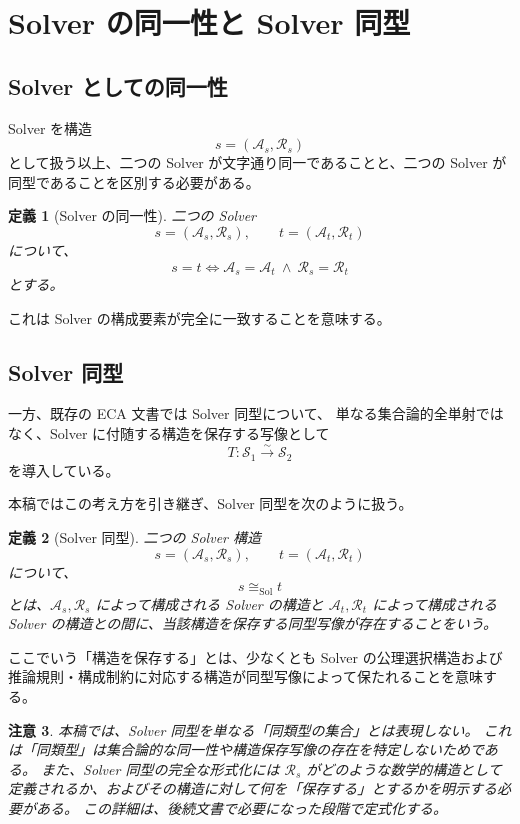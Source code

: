 \documentclass[a4paper,11pt]{jsarticle}
\newtheorem{definition}{定義}[section]
\newtheorem{remark}[definition]{注意}
\newcommand{\Solver}{\mathcal{S}}
\begin{document}
\section{Solver の同一性と Solver 同型}

\subsection{Solver としての同一性}

Solver を構造
\[
s=(\mathcal{A}_s,\mathcal{R}_s)
\]
として扱う以上、二つの Solver が文字通り同一であることと、二つの Solver が同型であることを区別する必要がある。

\begin{definition}[Solver の同一性]
二つの Solver
\[
s=(\mathcal{A}_s,\mathcal{R}_s),
\qquad
t=(\mathcal{A}_t,\mathcal{R}_t)
\]
について、
\[
\boxed{
s=t
\iff
\mathcal{A}_s=\mathcal{A}_t
\ \land\
\mathcal{R}_s=\mathcal{R}_t
}
\]
とする。
\end{definition}

これは Solver の構成要素が完全に一致することを意味する。

\subsection{Solver 同型}

一方、既存の ECA 文書では Solver 同型について、
単なる集合論的全単射ではなく、Solver に付随する構造を保存する写像として
\[
T:\Solver_1\overset{\sim}{\longrightarrow}\Solver_2
\]
を導入している。

本稿ではこの考え方を引き継ぎ、Solver 同型を次のように扱う。

\begin{definition}[Solver 同型]
二つの Solver 構造
\[
s=(\mathcal{A}_s,\mathcal{R}_s),
\qquad
t=(\mathcal{A}_t,\mathcal{R}_t)
\]
について、
\[
\boxed{
s\cong_{\mathrm{Sol}}t
}
\]
とは、$\mathcal{A}_s,\mathcal{R}_s$ によって構成される Solver の構造と $\mathcal{A}_t,\mathcal{R}_t$ によって構成される Solver の構造との間に、当該構造を保存する同型写像が存在することをいう。
\end{definition}

ここでいう「構造を保存する」とは、少なくとも Solver の公理選択構造および推論規則・構成制約に対応する構造が同型写像によって保たれることを意味する。

\begin{remark}
本稿では、Solver 同型を単なる「同類型の集合」とは表現しない。
これは「同類型」は集合論的な同一性や構造保存写像の存在を特定しないためである。
また、Solver 同型の完全な形式化には $\mathcal{R}_s$ がどのような数学的構造として定義されるか、およびその構造に対して何を「保存する」とするかを明示する必要がある。
この詳細は、後続文書で必要になった段階で定式化する。
\end{remark}
\end{document}
